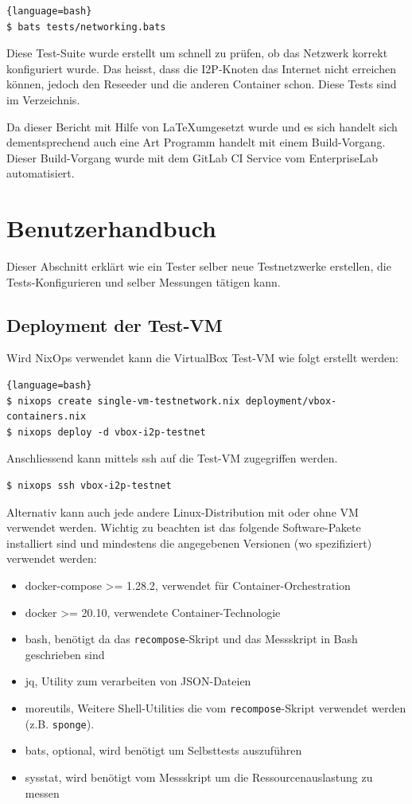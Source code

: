 \begin{lstlisting}{language=bash}
$ bats tests/networking.bats
\end{lstlisting}

Diese Test-Suite wurde erstellt um schnell zu prüfen, ob das Netzwerk korrekt konfiguriert wurde. Das heisst, dass die I2P-Knoten das Internet nicht erreichen können, jedoch den Reseeder und die anderen Container schon.
Diese Tests sind im Verzeichnis.

Da dieser Bericht mit Hilfe von \LaTeX umgesetzt wurde 
und es sich handelt sich dementsprechend auch eine Art Programm handelt mit einem Build-Vorgang.
Dieser Build-Vorgang wurde mit dem GitLab CI Service vom EnterpriseLab automatisiert.

\section{Benutzerhandbuch}

Dieser Abschnitt erklärt wie ein Tester selber neue Testnetzwerke erstellen, die Tests-Konfigurieren und selber Messungen tätigen kann.

\subsection{Deployment der Test-VM}

Wird NixOps verwendet kann die VirtualBox Test-VM wie folgt erstellt werden:

\begin{lstlisting}{language=bash}
$ nixops create single-vm-testnetwork.nix deployment/vbox-containers.nix
$ nixops deploy -d vbox-i2p-testnet
\end{lstlisting}

Anschliessend kann mittels ssh auf die Test-VM zugegriffen werden.

\begin{lstlisting}
$ nixops ssh vbox-i2p-testnet
\end{lstlisting}


Alternativ kann auch jede andere Linux-Distribution mit oder ohne VM verwendet werden.
Wichtig zu beachten ist das folgende Software-Pakete installiert sind und mindestens die angegebenen Versionen (wo spezifiziert) verwendet werden:

\begin{itemize}
    \item docker-compose >= 1.28.2, verwendet für Container-Orchestration
    \item docker >= 20.10, verwendete Container-Technologie
    \item bash, benötigt da das \lstinline|recompose|-Skript und das Messskript in Bash geschrieben sind
    \item jq, Utility zum verarbeiten von JSON-Dateien
    \item moreutils, Weitere Shell-Utilities die vom \lstinline|recompose|-Skript verwendet werden (z.B. \lstinline|sponge|).
    \item bats, optional, wird benötigt um Selbsttests auszuführen
    \item sysstat, wird benötigt vom Messskript um die Ressourcenauslastung zu messen
\end{itemize}


